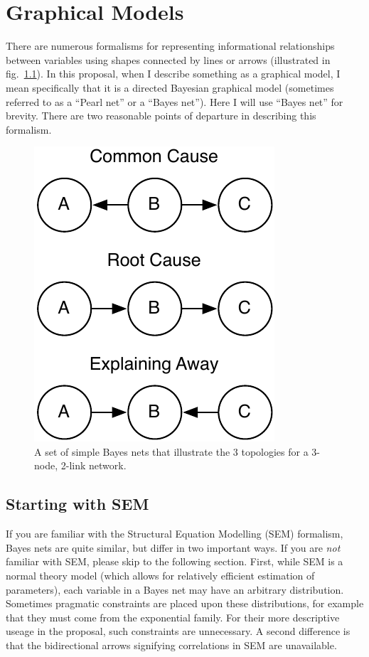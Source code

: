 \graphicspath{{appendices/graphical-models/}}

\chapter{Graphical Models}

There are numerous formalisms for representing informational relationships
between variables using shapes connected by lines or arrows (illustrated in
fig.~\ref{fig:bayes}). In this proposal, when I describe something as a
graphical model, I mean specifically that it is a directed Bayesian graphical
model (sometimes referred to as a ``Pearl net'' or a ``Bayes net''). Here I will use
``Bayes net'' for brevity.  There are two reasonable points of departure in
describing this formalism.

\begin{figure}
\begin{center}
\includegraphics{bayes-nets.pdf}
\end{center}
\caption{A set of simple Bayes nets that illustrate the 3 topologies for a
    3-node, 2-link network.}
\label{fig:bayes}
\end{figure}

\section{Starting with SEM}

If you are familiar with the Structural Equation Modelling (SEM) formalism,
Bayes nets are quite similar, but differ in two
important ways. If you are \emph{not} familiar with SEM, please skip to the
following section. First, while SEM is a normal theory model (which allows for
relatively efficient estimation of parameters), each variable in a Bayes net may
have an arbitrary distribution. Sometimes pragmatic constraints are
placed upon these distributions, for example that they must come from the
exponential family. For their more descriptive useage in the proposal, such
constraints are unnecessary. A second difference is that the bidirectional arrows
signifying correlations in SEM are unavailable.

